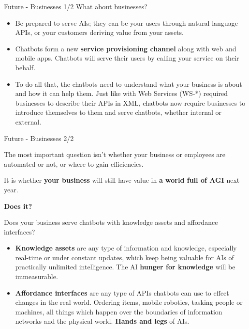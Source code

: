 \documentclass{beamer}
\begin{document}
\begin{frame}{Future - Businesses 1/2}
What about businesses?
\begin{itemize}
    \item Be prepared to serve AIs; they can be your users through natural language APIs, or your customers deriving value from your assets.
    \item Chatbots form a new \textbf{service provisioning channel} along with web and mobile apps. Chatbots will serve their users by calling your service on their behalf.
    \item To do all that, the chatbots need to understand what your business is about and how it can help them. Just like with Web Services (WS-*) required businesses to describe their APIs in XML, chatbots now require businesses to introduce themselves to them and serve chatbots, whether internal or external.
  \end{itemize}
\end{frame}
\begin{frame}{Future - Businesses 2/2}

The most important question isn't whether your business or employees are automated or not, or where to gain efficiencies.

It is whether \textbf{your business} will still have value in \textbf{a world full of AGI} next year.

\textbf{Does it?}

Does your business serve chatbots with knowledge assets and affordance interfaces?

  \begin{itemize}
    \item \textbf{Knowledge assets} are any type of information and knowledge, especially real-time or under constant updates, which keep being valuable for AIs of practically unlimited intelligence. The AI \textbf{hunger for knowledge} will be immeasurable.
    \item \textbf{Affordance interfaces} are any type of APIs chatbots can use to effect changes in the real world. Ordering items, mobile robotics, tasking people or machines, all things which happen over the boundaries of information networks and the physical world. \textbf{Hands and legs} of AIs.
  \end{itemize}


\end{frame}
\end{document}
